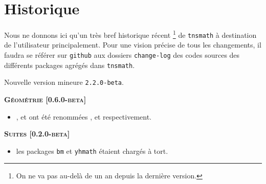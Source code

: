 \documentclass[12pt,a4paper]{book}
\begin{document}
\chapter{Historique}

Nous ne donnons ici qu'un très bref historique récent
\footnote{
	On ne va pas au-delà de un an depuis la dernière version.
}
de \verb+tnsmath+ à destination de l'utilisateur principalement.
Pour une vision précise de tous les changements, il faudra se référer sur \verb+github+ aux dossiers \verb+change-log+ des codes sources des différents packages agrégés dans \verb+tnsmath+.

\begin{description}

    \medskip
    \item[2021-03-03] Nouvelle version mineure \verb+2.2.0-beta+.
    
    
    
    
    \begin{center}
        \textbf{\textsc{Géométrie [0.6.0-beta]}}
    \end{center}
    
    \begin{itemize}[itemsep=.5em]
        \item {}
              ,
              et
              ont été renommées
              ,
              et
              respectivement.
    
    
    \end{itemize}
    
    
    \separation
    
    
    
    
    \begin{center}
        \textbf{\textsc{Suites [0.2.0-beta]}}
    \end{center}
    
    \begin{itemize}[itemsep=.5em]
        \item {}
              les packages \verb#bm# et \verb#yhmath# étaient chargés à tort.   
    \end{itemize}
    

\end{description}
\end{document}
